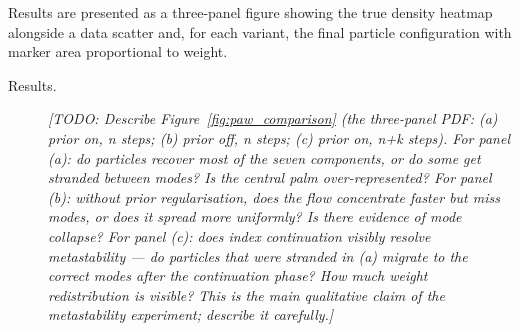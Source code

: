 Results are presented as a three-panel figure showing the true density heatmap alongside a
data scatter and, for each variant, the final particle configuration with marker area
proportional to weight.

\begin{description}
  \item[Results.]
  \textit{[TODO: Describe Figure~\ref{fig:paw_comparison} (the three-panel PDF:
  (a) prior on, n steps; (b) prior off, n steps; (c) prior on, n+k steps).
  For panel (a): do particles recover most of the seven components, or do some
  get stranded between modes?  Is the central palm over-represented?
  For panel (b): without prior regularisation, does the flow concentrate faster but
  miss modes, or does it spread more uniformly?  Is there evidence of mode collapse?
  For panel (c): does index continuation visibly resolve metastability ---
  do particles that were stranded in (a) migrate to the correct modes after the
  continuation phase?  How much weight redistribution is visible?
  This is the main qualitative claim of the metastability experiment; describe it carefully.]}
\end{description}
